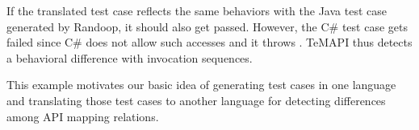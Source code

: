 If the translated test case reflects the same behaviors with the Java test case generated by Randoop, it should also get passed. However, the C\# test case gets failed since C\# does not allow such accesses and it throws . TeMAPI thus detects a behavioral difference with invocation sequences.

This example motivates our basic idea of generating test cases in one language and translating those test cases to another language for detecting differences among API mapping relations. %


